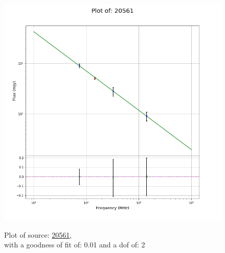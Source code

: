 \documentclass{article}
\begin{document}
\begin{figure}[H]
    \centering
    \begin{minipage}{.5\textwidth}
        \centering
        \includegraphics[scale = 0.35]{KmeulenTrap4P23_1min/1min20561.png}
        \captionsetup{labelformat=empty}
        \caption{Plot of source: \href{http://banana.transientskp.org/r4/vlo_KmeulenTrap4P23/runningcatalog/20561}{20561},\\with a goodness of fit of: 0.01 and a dof of: 2}
        \addtocounter{figure}{-1}
        \label{KmeulenTrap4P23:1min:20561:plot}
    \end{minipage}%
    \begin{minipage}{0.5\textwidth}
        \centering


\end{minipage}
\end{figure}
\end{document}
